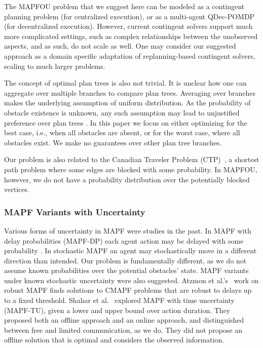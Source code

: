 \documentclass[letterpaper]{article} %
\begin{document}
The MAPFOU problem that we suggest here can be modeled as a contingent planning problem (for centralized execution), or as a multi-agent QDec-POMDP (for decentralized execution). However, current contingent solvers support much more complicated settings, such as complex relationships between the unobserved aspects, and as such, do not scale as well. One may consider our suggested approach as a domain specific adaptation of replanning-based contingent solvers, scaling to much larger problems.

The concept of optimal plan trees is also not trivial. It is unclear how one can aggregate over multiple branches to compare plan trees. Averaging over branches makes the underlying assumption of uniform distribution. As the probability of obstacle existence is unknown, any such assumption may lead to unjustified preference over plan trees \cite{shmaryahu2019comparative}. In this paper we focus on either optimizing for the best case, i.e., when all obstacles are absent, or for the worst case, where all obstacles exist. We make no guarantees over other plan tree branches.

Our problem is also related to the Canadian Traveler Problem (CTP)~\cite{papadimitriou1991shortest,bnaya2009canadian}, a shortest path problem where some edges are blocked with some probability. In MAPFOU, however, we do not have a probability distribution over the potentially blocked vertices. 

\subsubsection{MAPF Variants with Uncertainty}
Various forms of uncertainty in MAPF were studies in the past.
In MAPF with delay probabilities (MAPF-DP) each agent action may be delayed with some probability \cite{wagner2017path,honig2016multi,atzmon2020probabilistic}. In stochastic MAPF
\cite{levy2022online} an agent may stochastically move in a different direction than intended.   
Our problem is fundamentally different, as we do not assume known probabilities over the potential obstacles' state. 
MAPF variants under known stochastic uncertainty were also suggested. 
Atzmon et al.'s~ work on robust MAPF finds solutions to CMAPF problems that are robust to delays up to  a fixed threshold. 
Shahar et al.~ explored MAPF with time uncertainty (MAPF-TU), given a lower and upper bound over action duration. They proposed both an offline approach and an online approach, and distinguished between free and limited communication, as we do. 
They did not propose an offline solution that is optimal and considers the observed information. 
\end{document}
